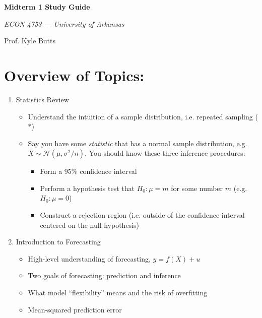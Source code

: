\documentclass[12pt]{article}
\begin{document}
\begin{center}
  {\Huge\bf Midterm 1 Study Guide}
  
  \smallskip
  {\large\it ECON 4753 — University of Arkansas}

  \medskip
  {\large Prof. Kyle Butts}
\end{center}

\section*{Overview of Topics:}
\begin{enumerate}
  \item[1.] Statistics Review
  \begin{itemize}
    \item Understand the intuition of a sample distribution, i.e. repeated sampling ($*$)

    \item Say you have some \emph{statistic} that has a normal sample distribution, e.g. $\bar{X} \sim \mathcal{N}(\mu, \sigma^2 / n)$. You should know these three inference procedures:
    \begin{itemize}
      \item Form a 95\% confidence interval
      
      \item Perform a hypothesis test that $H_0: \mu = m$ for some number $m$ (e.g. $H_0: \mu = 0$)
      
      \item Construct a rejection region (i.e. outside of the confidence interval centered on the null hypothesis)
    \end{itemize} 
  \end{itemize}

  \vspace{5mm}
  \item[2.] Introduction to Forecasting
  \begin{itemize}
    \item High-level understanding of forecasting, $y = f(X) + u$
    
    \item Two goals of forecasting: prediction and inference
    
    \item What model ``flexibility'' means and the risk of overfitting
    
    \item Mean-squared prediction error 
    

\end{itemize}
\end{enumerate}
\end{document}
